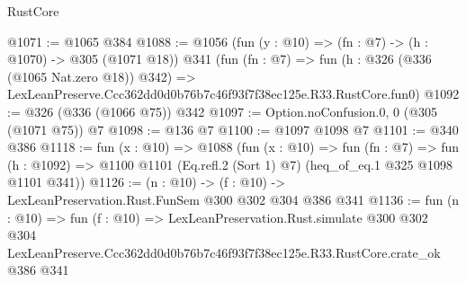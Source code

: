 \begin{lexlean}{RustCore}
\begin{coremodule}
@1071 := @1065 @384
@1088 := @1056
    (fun (y : @10) => (fn : @7) -> (h : @1070) -> @305 (@1071 @18))
    @341
    (fun (fn : @7) =>
    fun (h : @326 (@336 (@1065 Nat.zero @18)) @342) =>
    LexLeanPreserve.Ccc362dd0d0b76b7c46f93f7f38ec125e.R33.RustCore.fun0)
@1092 := @326 (@336 (@1066 @75)) @342
@1097 := Option.noConfusion.{0, 0} (@305 (@1071 @75)) @7
@1098 := @136 @7
@1100 := @1097 @1098 @7
@1101 := @340 @386
@1118 := fun (x : @10) =>
  @1088
    (fun (x : @10) =>
    fun (fn : @7) =>
    fun (h : @1092) => @1100 @1101 (Eq.refl.{2} (Sort 1) @7) (heq_of_eq.{1} @325 @1098 @1101 @341))
@1126 := (n : @10) -> (f : @10) -> LexLeanPreservation.Rust.FunSem @300 @302 @304 @386 @341
@1136 := fun (n : @10) =>
  fun (f : @10) =>
  LexLeanPreservation.Rust.simulate
    @300
    @302
    @304
    LexLeanPreserve.Ccc362dd0d0b76b7c46f93f7f38ec125e.R33.RustCore.crate_ok
    @386
    @341
\end{coremodule}
\end{lexlean}
